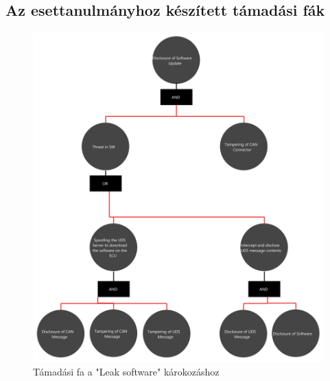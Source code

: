 \appendix
\chapter*{\fuggelek}
\setcounter{chapter}{\appendixnumber}

\section{Az esettanulmányhoz készített támadási fák}
\begin{figure}[!ht]
\centering
\includegraphics[width=120mm, keepaspectratio]{figures/AT-SECSW-00.png}
\caption{Támadási fa a "Leak software" károkozáshoz} 
\end{figure}
